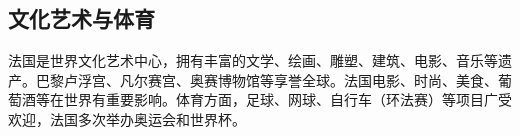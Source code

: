 \subsection{文化艺术与体育}

法国是世界文化艺术中心，拥有丰富的文学、绘画、雕塑、建筑、电影、音乐等遗产。巴黎卢浮宫、凡尔赛宫、奥赛博物馆等享誉全球。法国电影、时尚、美食、葡萄酒等在世界有重要影响。体育方面，足球、网球、自行车（环法赛）等项目广受欢迎，法国多次举办奥运会和世界杯。
